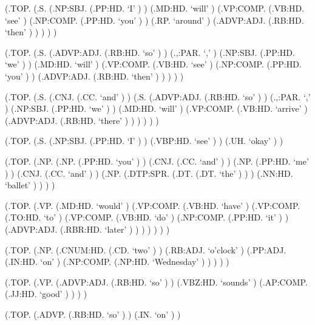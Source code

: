 \documentclass[10pt]{article}
\begin{document}
\begin{parsetree}  (.TOP. (.S. (.NP:SBJ. (.PP:HD. `I' ) ) (.MD:HD. `will' ) (.VP:COMP. (.VB:HD. `see' ) (.NP:COMP. (.PP:HD. `you' ) ) (.RP. `around' ) (.ADVP:ADJ. (.RB:HD. `then' ) ) ) ) ) \end{parsetree}

\begin{parsetree}  (.TOP. (.S. (.ADVP:ADJ. (.RB:HD. `so' ) ) (.,:PAR. `,' ) (.NP:SBJ. (.PP:HD. `we' ) ) (.MD:HD. `will' ) (.VP:COMP. (.VB:HD. `see' ) (.NP:COMP. (.PP:HD. `you' ) ) (.ADVP:ADJ. (.RB:HD. `then' ) ) ) ) ) \end{parsetree}

\begin{parsetree}  (.TOP. (.S. (.CNJ. (.CC. `and' ) ) (.S. (.ADVP:ADJ. (.RB:HD. `so' ) ) (.,:PAR. `,' ) (.NP:SBJ. (.PP:HD. `we' ) ) (.MD:HD. `will' ) (.VP:COMP. (.VB:HD. `arrive' ) (.ADVP:ADJ. (.RB:HD. `there' ) ) ) ) ) ) \end{parsetree}

\begin{parsetree}  (.TOP. (.S. (.NP:SBJ. (.PP:HD. `I' ) ) (.VBP:HD. `see' ) ) (.UH. `okay' ) ) \end{parsetree}

\begin{parsetree}  (.TOP. (.NP. (.NP. (.PP:HD. `you' ) ) (.CNJ. (.CC. `and' ) ) (.NP. (.PP:HD. `me' ) ) (.CNJ. (.CC. `and' ) ) (.NP. (.DTP:SPR. (.DT. (.DT. `the' ) ) ) (.NN:HD. `ballet' ) ) ) ) \end{parsetree}

\begin{parsetree}  (.TOP. (.VP. (.MD:HD. `would' ) (.VP:COMP. (.VB:HD. `have' ) (.VP:COMP. (.TO:HD. `to' ) (.VP:COMP. (.VB:HD. `do' ) (.NP:COMP. (.PP:HD. `it' ) ) (.ADVP:ADJ. (.RBR:HD. `later' ) ) ) ) ) ) ) \end{parsetree}

\begin{parsetree}  (.TOP. (.NP. (.CNUM:HD. (.CD. `two' ) ) (.RB:ADJ. `o'clock' ) (.PP:ADJ. (.IN:HD. `on' ) (.NP:COMP. (.NP:HD. `Wednesday' ) ) ) ) ) \end{parsetree}

\begin{parsetree}  (.TOP. (.VP. (.ADVP:ADJ. (.RB:HD. `so' ) ) (.VBZ:HD. `sounds' ) (.AP:COMP. (.JJ:HD. `good' ) ) ) ) \end{parsetree}

\begin{parsetree}  (.TOP. (.ADVP. (.RB:HD. `so' ) ) (.IN. `on' ) ) \end{parsetree}
\end{document}

